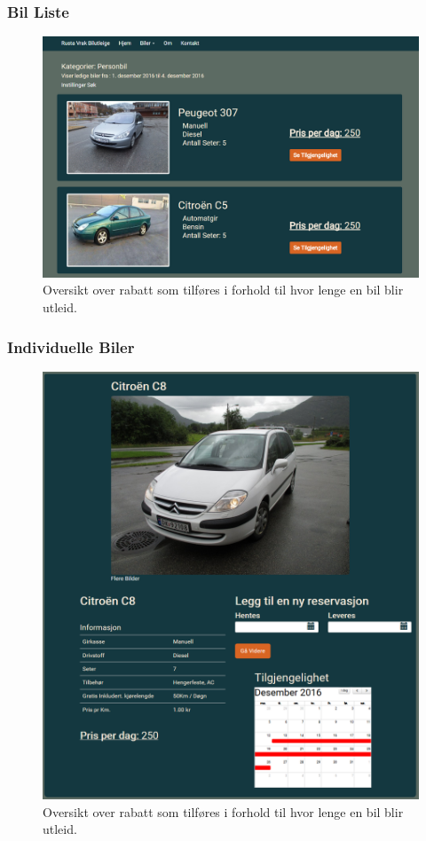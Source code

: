 \subsubsection{Bil Liste}
 \begin{figure}[htbp]
	\centering
		\includegraphics[scale=0.3]{Bilder/rv_carlist.png}
	\caption[Utleiepris Diagram]{Oversikt over rabatt som tilføres i forhold til hvor lenge en bil blir utleid. } %
	\label{fig:rv_carlist}
\end{figure}

\subsubsection{Individuelle Biler}
 \begin{figure}[htbp]
	\centering
		\includegraphics[scale=0.3]{Bilder/rv_individualcar.png}
	\caption[Utleiepris Diagram]{Oversikt over rabatt som tilføres i forhold til hvor lenge en bil blir utleid. } %
	\label{fig:rv_individualcar}
\end{figure}


